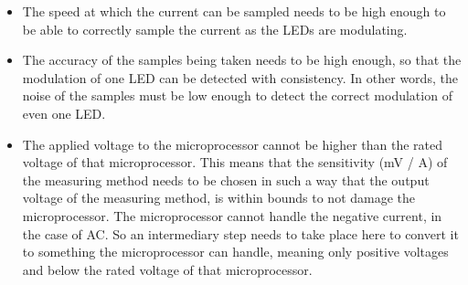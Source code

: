 	\begin{itemize}
		\item The speed at which the current can be sampled needs to be high enough to be able to correctly sample the current as the LEDs are modulating.

		\item The accuracy of the samples being taken needs to be high enough, so that the modulation of one LED can be detected with consistency.
		In other words, the noise of the samples must be low enough to detect the correct modulation of even one LED.

		\item The applied voltage to the microprocessor cannot be higher than the rated voltage of that microprocessor. This means that the sensitivity (mV / A) of the measuring method needs to be chosen in such a way that the output voltage of the measuring method, is within bounds to not damage the microprocessor.
		The microprocessor cannot handle the negative current, in the case of AC. So an intermediary step needs to take place here to convert it to something the microprocessor can handle, meaning only positive voltages and below the rated voltage of that microprocessor.

	\end{itemize}


















